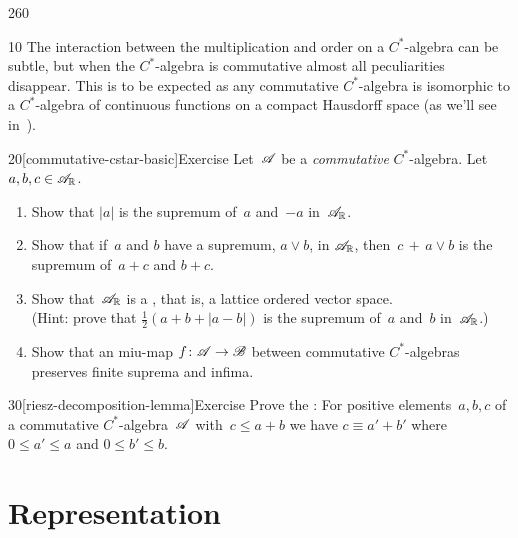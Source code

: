 \begin{parsec}{260}%
\begin{point}{10}%
The interaction between the multiplication and order
on a $C^*$-algebra can be subtle,
but
when the $C^*$-algebra is commutative
almost all peculiarities disappear.
This is to be expected
as any commutative $C^*$-algebra
is isomorphic to a $C^*$-algebra
of continuous functions on a compact Hausdorff space
(as we'll see in~).
\end{point}
\begin{point}{20}[commutative-cstar-basic]{Exercise}%
Let~$\mathscr{A}$ be a \emph{commutative} $C^*$-algebra.
Let~$a,b,c\in\mathscr{A}_{\mathbb{R}}$.
\begin{enumerate}
\item
Show that $\left| a\right|$ is the supremum of~$a$ and~$-a$
in~$\mathscr{A}_{\mathbb{R}}$.
\item
Show that if~$a$ and $b$ have a supremum, $a\vee b$, in $\mathscr{A}_{\mathbb{R}}$,
then~$c\,+\,a\vee b$ is the supremum of~$a+c$ and $b+c$.
\item
Show that~$\mathscr{A}_{\mathbb{R}}$ is a ,
that is,  a lattice ordered vector space.\\
(Hint: prove that $\frac{1}{2}(a+b+\left|a-b\right|)$
is the supremum of~$a$ and~$b$ in~$\mathscr{A}_{\mathbb{R}}$.)
\item
Show that an miu-map $f\colon \mathscr{A}\to\mathscr{B}$
between commutative $C^*$-algebras
preserves finite suprema and infima.
\end{enumerate}%
\spacingfix%
\end{point}%
\begin{point}{30}[riesz-decomposition-lemma]{Exercise}%
Prove the :%
For positive elements~$a,b,c$ of a commutative $C^*$-algebra~$\mathscr{A}$
with~$c\leq a+b$
we have $c\equiv a'+b'$
where  $0\leq a'\leq a$ and $0\leq b'\leq b$.
\end{point}
\end{parsec}
\section{Representation}

